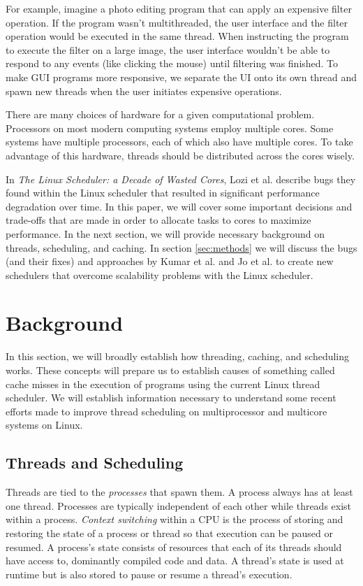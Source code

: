 \documentclass{sig-alternate}
\begin{document}
For example, imagine a photo editing program that can apply an expensive filter operation. If the program wasn't multithreaded, the user interface and the filter operation would be executed in the same thread. When instructing the program to execute the filter on a large image, the user interface wouldn't be able to respond to any events (like clicking the mouse) until filtering was finished. To make GUI programs more responsive, we separate the UI onto its own thread and spawn new threads when the user initiates expensive operations.

There are many choices of hardware for a given computational problem. Processors on most modern computing systems employ multiple cores. Some systems have multiple processors, each of which also have multiple cores. To take advantage of this hardware, threads should be distributed across the cores wisely.

In \emph{The Linux Scheduler: a Decade of Wasted Cores}, Lozi et al. describe bugs they found within the Linux scheduler that resulted in significant performance degradation over time. In this paper, we will cover some important decisions and trade-offs that are made in order to allocate tasks to cores to maximize performance. In the next section, we will provide necessary background on threads, scheduling, and caching. In section \ref{sec:methods} we will discuss the bugs (and their fixes) and approaches by Kumar et al. and Jo et al. to create new schedulers that overcome scalability problems with the Linux scheduler.
\section{Background}
\label{sec:bg}

In this section, we will broadly establish how threading, caching, and scheduling works. These concepts will prepare us to establish causes of something called cache misses in the execution of programs using the current Linux thread scheduler. We will establish information necessary to understand some recent efforts made to improve thread scheduling on multiprocessor and multicore systems on Linux.

\subsection{Threads and Scheduling}
\label{sec:threads}

Threads are tied to the \emph{processes} that spawn them. A process always has at least one thread. Processes are typically independent of each other while threads exist within a process. \emph{Context switching} within a CPU is the process of storing and restoring the state of a process or thread so that execution can be paused or resumed. A process's state consists of resources that each of its threads should have access to, dominantly compiled code and data. A thread's state is used at runtime but is also stored to pause or resume a thread's execution.
\end{document}

